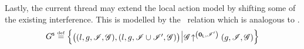 
Lastly, the current thread may extend the local action model by shifting some of the existing interference. This is modelled by the \shiftG\ relation which is analogous to \shiftR.
%
\[
\shiftG \eqdef
\left\{
\begin{array}{@{} l @{\hspace*{2pt}} | @{\hspace*{2pt}} r @{}}
  \left(
  \begin{array}{@{} l @{}}
    (l, g, \lmod, \gmod),
    \left( l, g, \lmod \cup \lmod', \gmod  \right)
  \end{array}
  \right)
  &
  \expandsAM{\gmod}{\unitL}{\lmod'}{g}{\lmod}{\gmod}
\end{array}
\right\}
\]


